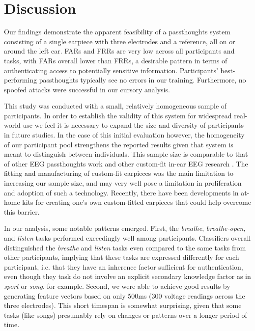 \documentclass{sigchi}
\begin{document}
\section{Discussion}

Our findings demonstrate the apparent feasibility of a passthoughts system consisting of a single earpiece with three electrodes and a reference, all on or around the left ear. FARs and FRRs are very low across all participants and tasks, with FARs overall lower than FRRs, a desirable pattern in terms of authenticating access to potentially sensitive information. Participants' best-performing passthoughts typically see no errors in our training. Furthermore, no spoofed attacks were successful in our cursory analysis.

This study was conducted with a small, relatively homogeneous sample of participants. In order to establish the validity of this system for widespread real-world use we feel it is necessary to expand the size and diversity of participants in future studies. In the case of this initial evaluation however, the homogeneity of our participant pool strengthens the reported results given that system is meant to distinguish between individuals. 
This sample size is comparable to that of other EEG passthoughts work \cite{Ashby2011, Marcel2007a, Poulos2002, Chuang2013b, curran2016passthoughts} and other custom-fit in-ear EEG research \cite{Kidmose2013a, Mikkelsen2015}. 
The fitting and manufacturing of custom-fit earpieces was the main limitation to increasing our sample size, and may very well pose a limitation in proliferation and adoption of such a technology. Recently, there have been developments in at-home kits for creating one's own custom-fitted earpieces \cite{voix2015settable} that could help overcome this barrier.

In our analysis, some notable patterns emerged. First, the \textit{breathe},
\textit{breathe-open}, and \textit{listen} tasks performed exceedingly well among participants.
Classifiers overall distinguished the \textit{breathe}  and \textit{listen} tasks even compared
to the same tasks from other participants, implying that these tasks are expressed differently
for each participant, i.e. that they have an inherence factor sufficient for authentication,
even though they task do not involve an explicit secondary knowledge factor as in \textit{sport}
or \textit{song}, for example. Second, we were able to achieve good results by generating feature
vectors based on only 500ms (300 voltage readings across the three electrodes).
This short timespan is somewhat surprising, given that some tasks (like songs)
presumably rely on changes or patterns over a longer period of time.
\end{document}
